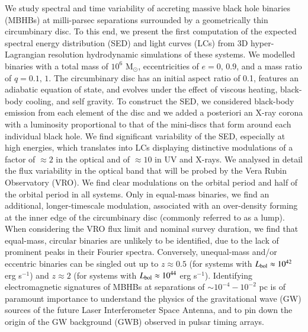 \documentclass{aa}
\begin{document}
\abstract
{We study spectral and time variability of accreting massive black hole binaries (MBHBs) at milli-parsec separations surrounded by a geometrically thin circumbinary disc. To this end, we present the first computation of the expected spectral energy distribution (SED) and light curves (LCs) from 3D hyper-Lagrangian resolution hydrodynamic simulations of these systems. We modelled binaries with a total mass of $10^6$ M$_\odot$, eccentricities of $e=0,\, 0.9$, and a mass ratio of $q=0.1,\, 1$. The circumbinary disc has an initial aspect ratio of 0.1, features an adiabatic equation of state, and evolves under the effect of viscous heating, black-body cooling, and self gravity. To construct the SED, we considered black-body emission from each element of the disc and we added a posteriori an X-ray corona with a luminosity proportional to that of the mini-discs that form around each individual black hole. We find significant variability of the SED, especially at high energies, which translates into LCs displaying distinctive modulations of a factor of $\approx 2$ in the optical and of $\approx 10$ in UV and X-rays.
We analysed in detail the flux variability in the optical band that will be probed by the Vera Rubin Observatory (VRO). We find clear modulations on the orbital period and half of the orbital period in all systems.
Only in equal-mass binaries, we find an additional, longer-timescale modulation, associated with an over-density forming at the inner edge of the circumbinary disc (commonly referred to as a lump).
When considering the VRO flux limit and nominal survey duration, we find that equal-mass, circular binaries are unlikely to be identified, due to the lack of prominent peaks in their Fourier spectra. Conversely, unequal-mass and/or eccentric binaries can be singled out up to $z\approx 0.5$ (for systems with $L_{\rm bol}\approx 10^{42}$ erg s$^{-1}$) and $z\approx 2$ (for systems with $L_{\rm bol}\approx 10^{44}$ erg s$^{-1}$). Identifying electromagnetic signatures of MBHBs at separations of $\sim 10^{-4}-10^{-2}$ pc is of paramount importance to understand the physics of the gravitational wave (GW) sources of the future Laser Interferometer Space Antenna, and to pin down the origin of the GW background (GWB) observed in pulsar timing arrays.}

   
\end{document}
